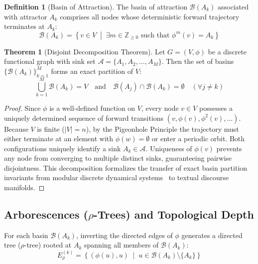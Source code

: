 \documentclass[10pt,twocolumn]{article}
\theoremstyle{definition}
\newtheorem{definition}{Definition}
\newtheorem{theorem}{Theorem}
\begin{document}
\begin{definition}[Basin of Attraction]
The basin of attraction $\mathcal{B}(A_k)$ associated with attractor $A_k$ comprises all nodes whose deterministic forward trajectory terminates at $A_k$:
\begin{equation}
\mathcal{B}(A_k) = \left\{ v \in V \;\middle|\; \exists m \in \mathbb{Z}_{\ge 0} \text{ such that } \phi^m(v) = A_k \right\}
\end{equation}
\end{definition}

\begin{theorem}[Disjoint Decomposition Theorem]
Let $G = (V, \phi)$ be a discrete functional graph with sink set $\mathcal{A} = \{A_1, A_2, \dots, A_M\}$. Then the set of basins $\{\mathcal{B}(A_k)\}_{k=1}^M$ forms an exact partition of $V$:
\begin{equation}
\bigcup_{k=1}^M \mathcal{B}(A_k) = V \quad \text{and} \quad \mathcal{B}(A_j) \cap \mathcal{B}(A_k) = \emptyset \quad (\forall j \ne k)
\end{equation}
\end{theorem}
\begin{proof}
Since $\phi$ is a well-defined function on $V$, every node $v \in V$ possesses a uniquely determined sequence of forward transitions $(v, \phi(v), \phi^2(v), \dots)$. Because $V$ is finite ($|V| = n$), by the Pigeonhole Principle the trajectory must either terminate at an element with $\phi(w) = \emptyset$ or enter a periodic orbit. Both configurations uniquely identify a sink $A_k \in \mathcal{A}$. Uniqueness of $\phi(v)$ prevents any node from converging to multiple distinct sinks, guaranteeing pairwise disjointness. This decomposition formalizes the transfer of exact basin partition invariants from modular discrete dynamical systems~\cite{martins2026iterated} to textual discourse manifolds.
\end{proof}

\subsection{Arborescences ($\rho$-Trees) and Topological Depth}

For each basin $\mathcal{B}(A_k)$, inverting the directed edges of $\phi$ generates a directed tree ($\rho$-tree) rooted at $A_k$ spanning all members of $\mathcal{B}(A_k)$:
\begin{equation}
E_\rho^{(k)} = \left\{ (\phi(u), u) \;\middle|\; u \in \mathcal{B}(A_k) \setminus \{A_k\} \right\}
\end{equation}
\end{document}
